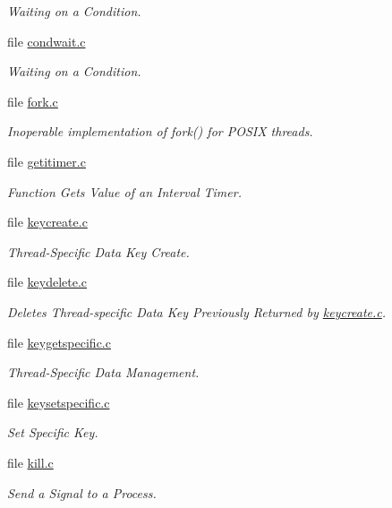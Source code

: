 \begin{DoxyCompactItemize}
\begin{DoxyCompactList}\small\item\em Waiting on a Condition. \end{DoxyCompactList}\item 
file \mbox{\hyperlink{condwait_8c}{condwait.\+c}}
\begin{DoxyCompactList}\small\item\em Waiting on a Condition. \end{DoxyCompactList}\item 
file \mbox{\hyperlink{fork_8c}{fork.\+c}}
\begin{DoxyCompactList}\small\item\em Inoperable implementation of fork() for P\+O\+S\+IX threads. \end{DoxyCompactList}\item 
file \mbox{\hyperlink{getitimer_8c}{getitimer.\+c}}
\begin{DoxyCompactList}\small\item\em Function Gets Value of an Interval Timer. \end{DoxyCompactList}\item 
file \mbox{\hyperlink{keycreate_8c}{keycreate.\+c}}
\begin{DoxyCompactList}\small\item\em Thread-\/\+Specific Data Key Create. \end{DoxyCompactList}\item 
file \mbox{\hyperlink{keydelete_8c}{keydelete.\+c}}
\begin{DoxyCompactList}\small\item\em Deletes Thread-\/specific Data Key Previously Returned by \mbox{\hyperlink{keycreate_8c}{keycreate.\+c}}. \end{DoxyCompactList}\item 
file \mbox{\hyperlink{keygetspecific_8c}{keygetspecific.\+c}}
\begin{DoxyCompactList}\small\item\em Thread-\/\+Specific Data Management. \end{DoxyCompactList}\item 
file \mbox{\hyperlink{keysetspecific_8c}{keysetspecific.\+c}}
\begin{DoxyCompactList}\small\item\em Set Specific Key. \end{DoxyCompactList}\item 
file \mbox{\hyperlink{kill_8c}{kill.\+c}}
\begin{DoxyCompactList}\small\item\em Send a Signal to a Process. \end{DoxyCompactList}\item 

\end{DoxyCompactItemize}
